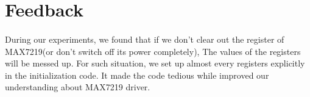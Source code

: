 \section{Feedback}
\paragraph{}
During our experiments, we found that if we don't clear out the register of MAX7219(or don't switch off its power completely),
The values of the registers will be messed up.
For such situation, we set up almost every registers explicitly in the initialization code.
It made the code tedious while improved our understanding about MAX7219 driver.
